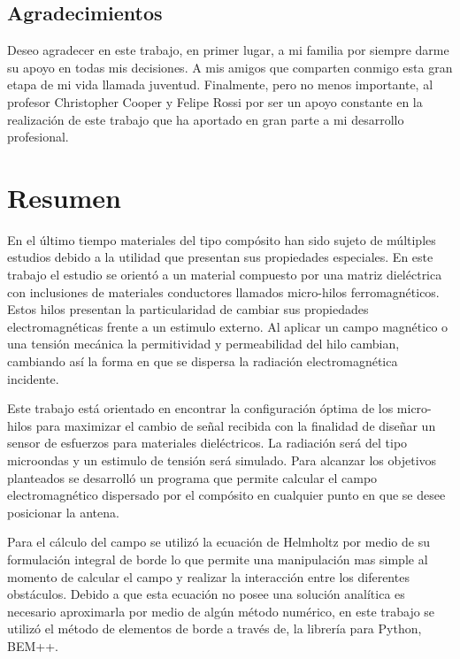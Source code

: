 \documentclass[12pt,letterpaper]{article}
\numberwithin{equation}{section}
\begin{document}
\begin{center}
	\section*{Agradecimientos}

	Deseo agradecer en este trabajo, en primer lugar, a mi familia por siempre darme su apoyo en todas mis decisiones. A mis amigos que comparten conmigo esta gran etapa de mi vida llamada juventud. Finalmente, pero no menos importante, al profesor Christopher Cooper y Felipe Rossi por ser un apoyo constante en la realización de este trabajo que ha aportado en gran parte a mi desarrollo profesional.

\end{center}


\pagebreak
\section*{Resumen}
En el último tiempo materiales del tipo compósito han sido sujeto de múltiples estudios debido a la utilidad que presentan sus propiedades especiales. En este trabajo el estudio se orientó a un material compuesto por una matriz dieléctrica con inclusiones de materiales conductores llamados micro-hilos ferromagnéticos. Estos hilos presentan la particularidad de cambiar sus propiedades electromagnéticas frente a un estimulo externo. Al aplicar un campo magnético o una tensión mecánica la permitividad y permeabilidad del hilo cambian, cambiando así la forma en que se dispersa la radiación electromagnética incidente.

Este trabajo está orientado en encontrar la configuración óptima de los micro-hilos para maximizar el cambio de señal recibida con la finalidad de diseñar un sensor de esfuerzos para materiales dieléctricos. La radiación será del tipo microondas y un estimulo de tensión será simulado. Para alcanzar los objetivos planteados se desarrolló un programa que permite calcular el campo electromagnético dispersado por el compósito en cualquier punto en que se desee posicionar la antena.

Para el cálculo del campo se utilizó la ecuación de Helmholtz por medio de su formulación integral de borde lo que permite una manipulación mas simple al momento de calcular el campo y realizar la interacción entre los diferentes obstáculos. Debido a que esta ecuación no posee una solución analítica es necesario aproximarla por medio de algún método numérico, en este trabajo se utilizó el método de elementos de borde a través de, la librería para Python, BEM++.
\end{document}
